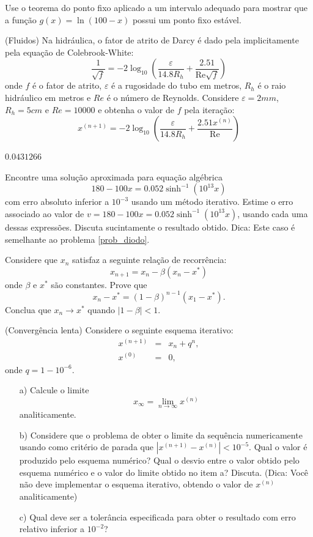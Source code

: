 \begin{exer}  Use o teorema do ponto fixo aplicado a um intervalo adequado para mostrar que a função $g(x)=\ln (100-x)$ possui um ponto fixo estável.
\end{exer}

\begin{exer}(Fluidos) Na hidráulica, o fator de atrito de Darcy é dado pela implicitamente pela equação de Colebrook-White:
$$\frac{1}{\sqrt{f}}= -2 \log_{10} \left( \frac{\varepsilon}{14.8 R_h} + \frac{2.51}{\mathrm{Re}\sqrt{f}} \right)$$
onde $f$ é o fator de atrito, $\varepsilon$ é a rugosidade do tubo em metros, $R_{h}$ é o raio hidráulico em metros e ${Re}$ é o número de Reynolds. Considere $\varepsilon=2mm$, $R_{h}=5cm$ e ${Re}=10000$ e obtenha o valor de $f$ pela iteração:
$$x^{(n+1)}=-2 \log_{10} \left( \frac{\varepsilon}{14.8 R_{h}} + \frac{2.51x^{(n)}}{\mathrm{Re}} \right)$$
\end{exer}
\begin{resp}
  
$0.0431266$
  
\end{resp}

\begin{exer} Encontre uma solução aproximada para equação algébrica
$$180-100x=0.052\sinh^{-1}(10^{13}x)$$
com erro absoluto inferior a $10^{-3}$ usando um método iterativo.
Estime o erro associado ao valor de $v=180-100x=0.052\sinh^{-1}(10^{13}x)$, usando cada uma dessas expressões. Discuta sucintamente o resultado obtido. Dica: Este caso é semelhante ao problema \ref{prob_diodo}.
\end{exer}

\begin{exer}Considere que $x_n$ satisfaz a seguinte relação de recorrência:
$$x_{n+1}=x_n - \beta \left(x_n-x^*\right)$$
onde $\beta$ e $x^*$ são constantes.
Prove que $$x_n-x^*=(1-\beta)^{n-1}(x_1-x^*).$$
Conclua que $x_n\to x^*$ quando $|1-\beta|<1$.
\end{exer}

\begin{exer}(Convergência lenta) Considere o seguinte esquema iterativo:
  \begin{eqnarray*}
    x^{(n+1)} &=& x_n+q^n,\\
    x^{(0)} &=& 0,   
  \end{eqnarray*}
onde $q=1-10^{-6}$.
\begin{itemize}
\item[a)] Calcule o limite $$x_\infty=\lim_{n\to\infty}x^{(n)}$$ analiticamente.
\item[b)] Considere que o problema de obter o limite da sequência numericamente usando como critério de parada que $|x^{(n+1)}-x^{(n)}|<10^{-5}$. Qual o valor é produzido pelo esquema numérico? Qual o desvio entre o valor obtido pelo esquema numérico e o valor do limite obtido no item a?  Discuta. (Dica: Você não deve implementar o esquema iterativo, obtendo o valor de $x^{(n)}$ analiticamente)
\item[c)] Qual deve ser a tolerância especificada para obter o resultado com erro relativo inferior a $10^{-2}$?
\end{itemize}
\end{exer}


